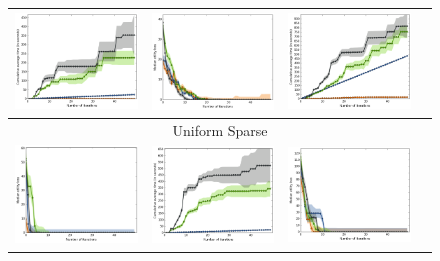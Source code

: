 \documentclass{article}
\renewcommand\[{\begin{equation}}
\renewcommand\]{\end{equation}}
\begin{document}
\begin{figure}[b]
{\begin{tabular}{cccc}
        \includegraphics[width=10em]{figures/synthetic_vs_others_3_normal_per_iter_time} &
        \includegraphics[width=10em]{figures/synthetic_vs_others_4_normal_per_iter_loss} &
        \includegraphics[width=10em]{figures/synthetic_vs_others_4_normal_per_iter_time}
        \\
        \hline
        \multicolumn{4}{c}{{\sc Uniform Sparse}}
        \\
        \includegraphics[width=10em]{figures/synthetic_vs_others_3_uniform_sparse_per_iter_loss} &
        \includegraphics[width=10em]{figures/synthetic_vs_others_3_uniform_sparse_per_iter_time} &
        \includegraphics[width=10em]{figures/synthetic_vs_others_4_uniform_sparse_per_iter_loss} &

\end{tabular}}
\end{figure}
\end{document}
